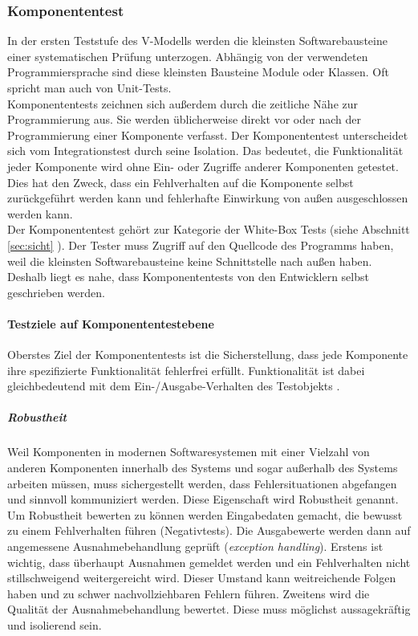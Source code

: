 \subsubsection{Komponententest}
\label{sec:unit_test}
In der ersten Teststufe des V-Modells werden die kleinsten Softwarebausteine einer systematischen Prüfung unterzogen. Abhängig von der verwendeten Programmiersprache sind diese kleinsten Bausteine Module oder Klassen. Oft spricht man auch von \Glspl{Unit-Test}.\\
Komponententests zeichnen sich außerdem durch die zeitliche Nähe zur Programmierung aus. Sie werden üblicherweise direkt vor oder nach der Programmierung einer Komponente verfasst. Der Komponententest unterscheidet sich vom Integrationstest durch seine Isolation. Das bedeutet, die Funktionalität jeder Komponente wird ohne Ein- oder Zugriffe anderer Komponenten getestet. Dies hat den Zweck, dass ein Fehlverhalten auf die Komponente selbst zurückgeführt werden kann und fehlerhafte Einwirkung von außen ausgeschlossen werden kann.\\
Der Komponententest gehört zur Kategorie der White-Box Tests (siehe Abschnitt \ref{sec:sicht} ). Der Tester muss Zugriff auf den Quellcode des Programms haben, weil die kleinsten Softwarebausteine keine Schnittstelle nach außen haben. Deshalb liegt es nahe, dass Komponententests von den Entwicklern selbst geschrieben werden.

\paragraph{Testziele auf Komponententestebene}
Oberstes Ziel der Komponententests ist die Sicherstellung, dass jede Komponente ihre spezifizierte Funktionalität fehlerfrei erfüllt. Funktionalität ist dabei gleichbedeutend mit dem Ein-/Ausgabe-Verhalten des Testobjekts \cite{spillner_basiswissen_2012}.\\

\subparagraph{Robustheit} Weil Komponenten in modernen Softwaresystemen mit einer Vielzahl von anderen Komponenten innerhalb des Systems und sogar außerhalb des Systems arbeiten müssen, muss sichergestellt werden, dass Fehlersituationen abgefangen und sinnvoll kommuniziert werden. Diese Eigenschaft wird Robustheit genannt. Um Robustheit bewerten zu können werden Eingabedaten gemacht, die bewusst zu einem Fehlverhalten führen (Negativtests). Die Ausgabewerte werden dann auf angemessene Ausnahmebehandlung geprüft (\textit{exception handling}). Erstens ist wichtig, dass überhaupt Ausnahmen gemeldet werden und ein Fehlverhalten nicht stillschweigend weitergereicht wird. Dieser Umstand kann weitreichende Folgen haben und zu schwer nachvollziehbaren Fehlern führen. Zweitens wird die Qualität der Ausnahmebehandlung bewertet. Diese muss möglichst aussagekräftig und isolierend sein.

